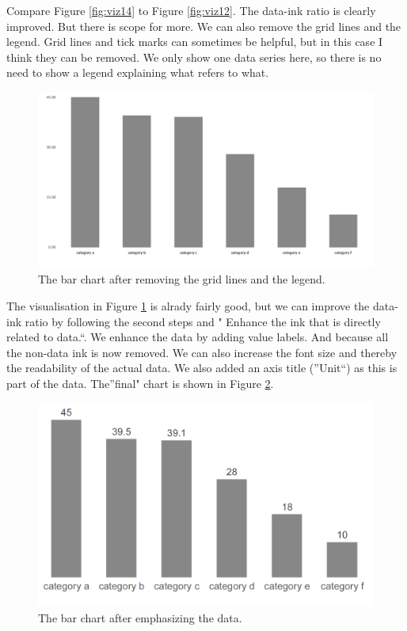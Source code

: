 \documentclass[]{book}
\begin{document}
Compare Figure \ref{fig:viz14} to Figure \ref{fig:viz12}. The data-ink ratio is clearly improved. But there is scope for more. We can also remove the grid lines and the legend. Grid lines and tick marks can sometimes be helpful, but in this case I think they can be removed. We only show one data series here, so there is no need to show a legend explaining what refers to what.

\begin{figure}

{\centering \includegraphics[width=0.7\linewidth]{_resources/chapter_viz/ex0_5} 

}

\caption{The bar chart after removing the grid lines and the legend.}\label{fig:viz15}
\end{figure}

The visualisation in Figure \ref{fig:viz15} is alrady fairly good, but we can improve the data-ink ratio by following the second steps and " Enhance the ink that is directly related to data.``. We enhance the data by adding value labels. And because all the non-data ink is now removed. We can also increase the font size and thereby the readability of the actual data. We also added an axis title (''Unit``) as this is part of the data. The''final" chart is shown in Figure \ref{fig:viz16}.

\begin{figure}

{\centering \includegraphics[width=0.7\linewidth]{_resources/chapter_viz/ex0_6} 

}

\caption{The bar chart after emphasizing the data.}\label{fig:viz16}
\end{figure}
\end{document}
